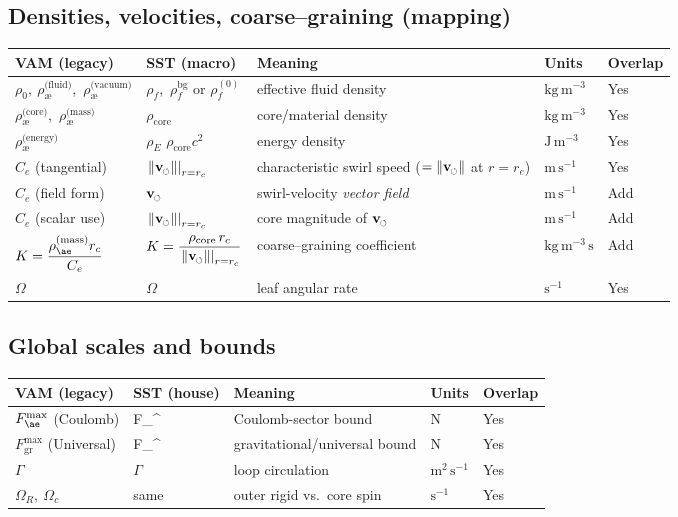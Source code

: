 \documentclass[11pt]{article}
\newcommand{\swirlarrow}{%
	\mathchoice{\mkern-2mu\scriptstyle\boldsymbol{\circlearrowleft}}%
	{\mkern-2mu\scriptstyle\boldsymbol{\circlearrowleft}}%
	{\mkern-2mu\scriptscriptstyle\boldsymbol{\circlearrowleft}}%
	{\mkern-2mu\scriptscriptstyle\boldsymbol{\circlearrowleft}}%
}
\newcommand{\vswirl}{\mathbf{v}_{\swirlarrow}}
\newcommand{\vscore}{v_s}                                %
\newcommand{\vnorm}{\lVert \vswirl \rVert}               %
\newcommand{\rhoF}{\rho_{\!f}}                           %
\newcommand{\rhoE}{\rho_{\!E}}                           %
\newcommand{\rhoC}{\rho_{\mathrm{core}}} %
\newcommand{\rs}{r_e}                                    %
\newcommand{\FmaxEM}{F_{\mathrm{EM}}^{\max}}             %
\newcommand{\FmaxG}{F_{\mathrm{G}}^{\max}}               %
\providecommand{\rc}{r_c} %
\newcommand{\vcore}{\left.\vnorm\right|_{r=\rc}}        %
\renewcommand{\vscore}{\vcore}
\begin{document}
	\subsection*{Densities, velocities, coarse–graining (mapping)}
	\begin{center}
		\scriptsize
		\begin{tabular}{lllll}
			\hline
			\textbf{VAM (legacy)} & \textbf{SST (macro)} & \textbf{Meaning} & \textbf{Units} & \textbf{Overlap} \\
			\hline
			$\rho_0,\ \rho_{\text{\ae}}^{\text{(fluid)}}$,\ $\rho_{\text{\ae}}^{\text{(vacuum)}}$ & $\rhoF$,\ $\rhoF^{\mathrm{bg}}$ or $\rhoF^{(0)}$ & effective fluid density & $\mathrm{kg\,m^{-3}}$ & Yes \\
			$\rho_{\text{\ae}}^{\text{(core)}}$,\ 	$\rho_{\text{\ae}}^{\text{(mass)}}$  & $\rhoC$ & core/material density & $\mathrm{kg\,m^{-3}}$ & Yes \\
			$\rho_{\text{\ae}}^{\text{(energy)}}$ & $\rhoE$ \text{ (or } $\rhoC c^2$\text{)} & energy density & $\mathrm{J\,m^{-3}}$ & Yes \\
			$C_e$ (tangential) & $\vscore$ & characteristic swirl speed ($=\|\vswirl\|$ at $r=\rs$) & $\mathrm{m\,s^{-1}}$ & Yes \\
			$C_e$ (field form) & $\vswirl$ & swirl-velocity \emph{vector field} & $\mathrm{m\,s^{-1}}$ & Add \\
			$C_e$ (scalar use) & $\left.\vnorm\right|_{r=\rc}$ & core magnitude of $\vswirl$ & $\mathrm{m\,s^{-1}}$ & Add \\
			$K=\dfrac{\rho_{\ae}^{(\text{mass})} r_c}{C_e}$ & $K=\dfrac{\rhoC\,\rc}{\left.\vnorm\right|_{r=\rc}}$ & coarse–graining coefficient & $\mathrm{kg\,m^{-3}\,s}$ & Add \\
			$\Omega$ & $\Omega$ & leaf angular rate & $\mathrm{s^{-1}}$ & Yes \\
			\hline
		\end{tabular}
	\end{center}

	\subsection*{Global scales and bounds}
	\begin{center}
		\begin{tabular}{lllll}
			\hline
			\textbf{VAM (legacy)} & \textbf{SST (house)} & \textbf{Meaning} & \textbf{Units} & \textbf{Overlap} \\
			\hline
			$F_{\ae}^{\max}$ (Coulomb) & \FmaxEM & Coulomb-sector bound & $\mathrm{N}$ & Yes \\
			$F_{\mathrm{gr}}^{\max}$ (Universal) & \FmaxG & gravitational/universal bound & $\mathrm{N}$ & Yes \\
			$\Gamma$ & $\Gamma$ & loop circulation & $\mathrm{m^{2}\,s^{-1}}$ & Yes \\
			$\Omega_R,\ \Omega_c$ & same & outer rigid vs.\ core spin & $\mathrm{s^{-1}}$ & Yes \\
			\hline
		\end{tabular}
	\end{center}
\end{document}
